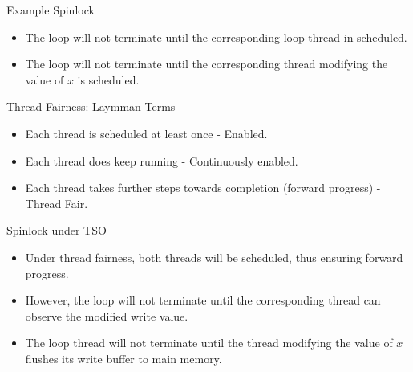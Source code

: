 \documentclass[dvipsnames, notes]{beamer}
\begin{document}
    \begin{frame}{Example Spinlock}

      \begin{figure}
      \end{figure}

      \begin{itemize}
        \item The loop will not terminate until the corresponding loop thread in scheduled.
        \item The loop will not terminate until the corresponding thread modifying the value of $x$ is scheduled.
      \end{itemize}
      

    \end{frame}

    \begin{frame}{Thread Fairness: Laymman Terms}
        \begin{itemize}
          \item Each thread is scheduled at least once - Enabled. 
          \item Each thread does keep running - Continuously enabled. 
          \item Each thread takes further steps towards completion (forward progress) - Thread Fair.
        \end{itemize}
    \end{frame}

    \begin{frame}{Spinlock under TSO}

      \begin{figure}
      \end{figure}

      \begin{itemize}
        \item Under thread fairness, both threads will be scheduled, thus ensuring forward progress. 
        \item However, the loop will not terminate until the corresponding thread can observe the modified write value. 
        \item The loop thread will not terminate until the thread modifying the value of $x$ flushes its write buffer to main memory.
      \end{itemize}
    \end{frame}
\end{document}
